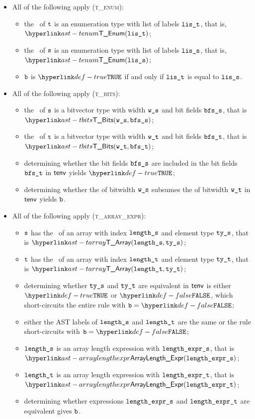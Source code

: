 \begin{itemize}
\item All of the following apply (\textsc{t\_enum}):
  \begin{itemize}
  \item the \underlyingtype\ of $\texttt{t}$ is an enumeration type with list of labels $\texttt{lis\_t}$, that is, $\TEnum(\vlit)$;
  \item the \underlyingtype\ of $\texttt{s}$ is an enumeration type with list of labels $\texttt{lis\_s}$, that is, $\TEnum(\vlis)$;
  \item $\texttt{b}$ is $\True$ if and only if $\texttt{lis\_t}$ is equal to $\texttt{lis\_s}$.
  \end{itemize}

\item All of the following apply (\textsc{t\_bits}):
  \begin{itemize}
  \item the \underlyingtype\ of $\texttt{s}$ is a bitvector type with width $\texttt{w\_s}$ and bit fields $\texttt{bfs\_s}$, that is $\TBits(\ws, \bfss)$;
  \item the \underlyingtype\ of $\texttt{t}$ is a bitvector type with width $\texttt{w\_t}$ and bit fields $\texttt{bfs\_t}$, that is $\TBits(\wt, \bfst)$;
  \item determining whether the bit fields $\texttt{bfs\_s}$ are included in the bit fields $\texttt{bfs\_t}$ in $\textsf{tenv}$ yields $\True$\ProseOrTypeError;
  \item determining whether the \symbolicdomain{} of bitwidth $\texttt{w\_s}$ subsumes the \symbolicdomain{} of bitwidth $\texttt{w\_t}$ in $\textsf{tenv}$ yields $\texttt{b}$.
  \end{itemize}

\item All of the following apply (\textsc{t\_array\_expr}):
  \begin{itemize}
  \item $\texttt{s}$ has the \underlyingtype\ of an array with index $\texttt{length\_s}$ and element type $\texttt{ty\_s}$, that is $\TArray(\vlengths, \vtys)$;
  \item $\texttt{t}$ has the \underlyingtype\ of an array with index $\texttt{length\_t}$ and element type $\texttt{ty\_t}$, that is $\TArray(\vlengtht, \vtyt)$;
  \item determining whether $\texttt{ty\_s}$ and $\texttt{ty\_t}$ are equivalent in $\textsf{tenv}$ is either $\True$
  or $\False$, which short-circuits the entire rule with $\vb=\False$;
  \item either the AST labels of $\texttt{length\_s}$ and $\texttt{length\_t}$ are the same or the rule short-circuits with $\vb=\False$;
  \item $\texttt{length\_s}$ is an array length expression with $\texttt{length\_expr\_s}$, that is \\ $\ArrayLengthExpr(\vlengthexprs)$;
  \item $\texttt{length\_t}$ is an array length expression with $\texttt{length\_expr\_t}$, that is \\ $\ArrayLengthExpr(\vlengthexprt)$;
  \item determining whether expressions $\texttt{length\_expr\_s}$ and $\texttt{length\_expr\_t}$ are equivalent gives $\texttt{b}$.
  \end{itemize}


\end{itemize}
